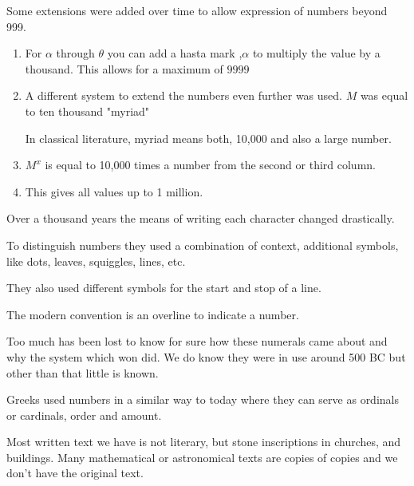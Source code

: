 \documentclass{report}
\begin{document}
\begin{description}
\begin{mdframed}
            Some extensions were added over time to allow
            expression of numbers beyond 999.
            \begin{enumerate}
                \item For $\alpha$ through $\theta$ 
                    you can add a hasta mark ,$\alpha$ to
                    multiply the value by a thousand.
                    This allows for a maximum of 
                    $9999$
                \item A different system to extend the numbers
                    even further was used. $M$ was equal to
                    ten thousand "myriad"
                    \begin{mdframed}
                        In classical literature, myriad
                        means both, 10,000 and also a
                        large number.
                    \end{mdframed}
                \item $M^x$ is equal to 10,000 times a number
                    from the second or third column.
                \item This gives all values up to
                   1 million. 
            \end{enumerate}

            Over a thousand years the means of writing
            each character changed drastically.

            To distinguish numbers they used a combination
            of context, additional symbols, like dots,
            leaves, squiggles, lines, etc.

            They also used different symbols for the start
            and stop of a line.

            The modern convention is an overline to indicate
            a number.

            Too much has been lost to know for sure how these
            numerals came about and why the system which won
            did. We do know they were in use around 500 BC
            but other than that little is known.
        \end{mdframed}
        \begin{mdframed}
            Greeks used numbers in a similar way to today
            where they can serve as ordinals or cardinals,
            order and amount.
        \end{mdframed}
        \begin{mdframed}
            Most written text we have is not literary,
            but stone inscriptions in churches, and buildings.
            Many mathematical or astronomical texts are copies
            of copies and we don't have the original text.


\end{mdframed}
\end{description}
\end{document}

